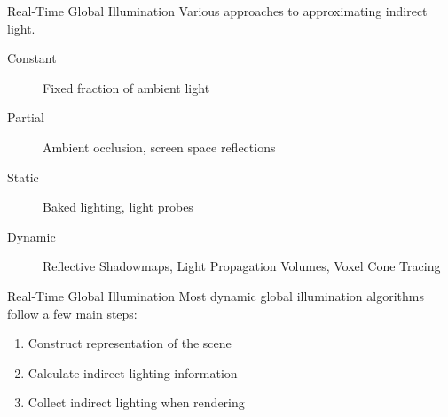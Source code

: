 \documentclass[10pt]{beamer}
\begin{document}
\begin{frame}{Real-Time Global Illumination}
  Various approaches to approximating indirect light.

  \begin{description}
    \item[Constant] Fixed fraction of ambient light %
    \item[Partial] Ambient occlusion, screen space reflections %
    \item[Static] Baked lighting, light probes
    \item[Dynamic] Reflective Shadowmaps, Light Propagation Volumes, Voxel Cone Tracing
  \end{description}
\end{frame}

\begin{frame}{Real-Time Global Illumination}
  Most dynamic global illumination algorithms follow a few main steps:

  \begin{enumerate}
    \item Construct representation of the scene
    \item Calculate indirect lighting information
    \item Collect indirect lighting when rendering
  \end{enumerate}

\end{frame}
\end{document}

